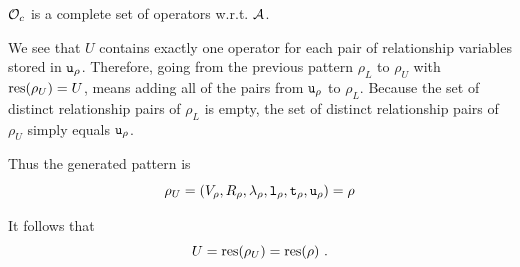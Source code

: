 \begin{proofof}{$\mathcal{O}_c$ is a complete set of operators w.r.t.
                $\mathcal{A}$.}
\begin{enumerate}
      We see that $U$ contains exactly one  operator for each
      pair of relationship variables stored in $\texttt{u}_\rho$.
      Therefore, going from the previous pattern $\rho_L$ to $\rho_U$
      with $\text{res}(\rho_U) = U$, means adding all of the pairs from
      $\texttt{u}_\rho$ to $\rho_L$.
      Because the set of distinct relationship pairs of $\rho_L$ is empty, the
      set of distinct relationship pairs of $\rho_U$ simply equals
      $\texttt{u}_\rho$.
      
      Thus the generated pattern is
      \[
         \rho_U = (V_\rho, R_\rho, \lambda_\rho, \texttt{l}_\rho, \texttt{t}_\rho, \texttt{u}_\rho) = \rho
      \]
      
      It follows that
      \[
        U = \text{res}(\rho_U) = \text{res}(\rho) ~\text{.}
      \]
  \end{enumerate}
\end{proofof}

%
%
